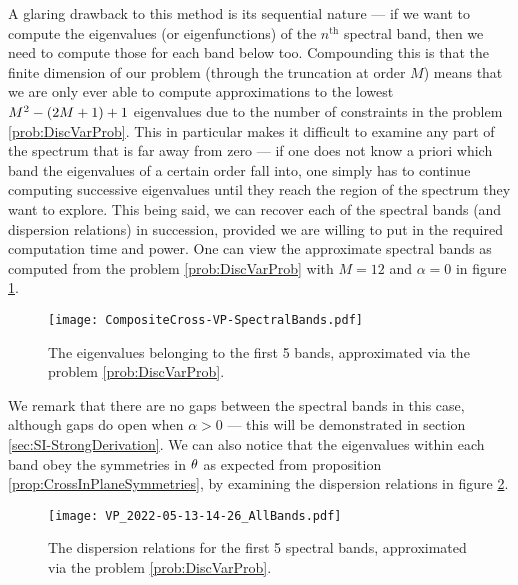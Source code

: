 A glaring drawback to this method is its sequential nature --- if we want to compute the eigenvalues (or eigenfunctions) of the $n^{\text{th}}$ spectral band, then we need to compute those for each band below too.
Compounding this is that the finite dimension of our problem (through the truncation at order $M$) means that we are only ever able to compute approximations to the lowest $M^2 - \left( 2M + 1 \right) + 1$ eigenvalues due to the number of constraints in the problem \ref{prob:DiscVarProb}.
This in particular makes it difficult to examine any part of the spectrum that is far away from zero --- if one does not know a priori which band the eigenvalues of a certain order fall into, one simply has to continue computing successive eigenvalues until they reach the region of the spectrum they want to explore.
This being said, we can recover each of the spectral bands (and dispersion relations) in succession, provided we are willing to put in the required computation time and power.
One can view the approximate spectral bands as computed from the problem \ref{prob:DiscVarProb} with $M=12$ and $\alpha=0$ in figure \ref{fig:CompositeCross-VP-SpectralBands}.
\begin{figure}[t!]
	\centering
	\texttt{[image: CompositeCross-VP-SpectralBands.pdf]}
	\caption[Eigenvalues of \eqref{eq:SI-WaveEqn}, computed via solution of problem \ref{prob:DiscVarProb}.]{\label{fig:CompositeCross-VP-SpectralBands} The eigenvalues belonging to the first 5 bands, approximated via the problem \ref{prob:DiscVarProb}.}
\end{figure}
We remark that there are no gaps between the spectral bands in this case, although gaps do open when $\alpha>0$ --- this will be demonstrated in section \ref{sec:SI-StrongDerivation}.
We can also notice that the eigenvalues within each band obey the symmetries in $\theta$ as expected from proposition \ref{prop:CrossInPlaneSymmetries}, by examining the dispersion relations in figure \ref{fig:VP_AllBands}.
\begin{figure}[t!]
	\centering
	\texttt{[image: VP\_2022-05-13-14-26\_AllBands.pdf]}
	\caption[Dispersion relations for the first 5 spectral bands of \eqref{eq:SI-WaveEqn}, computed via solution of problem \ref{prob:DiscVarProb}.]{\label{fig:VP_AllBands} The dispersion relations for the first 5 spectral bands, approximated via the problem \ref{prob:DiscVarProb}.}
\end{figure}